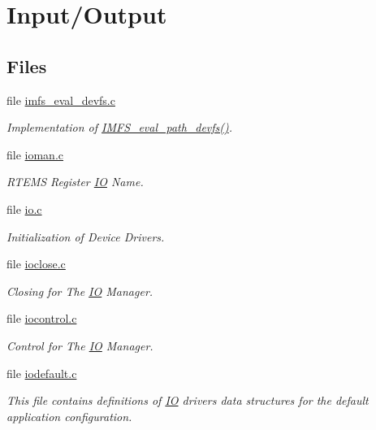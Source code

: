 \hypertarget{group__ClassicIO}{}\section{Input/\+Output}
\label{group__ClassicIO}
\subsection*{Files}
\begin{DoxyCompactItemize}
\item 
file \mbox{\hyperlink{imfs__eval__devfs_8c}{imfs\+\_\+eval\+\_\+devfs.\+c}}
\begin{DoxyCompactList}\small\item\em Implementation of \mbox{\hyperlink{group__IMFS_gafb8a8a9bc61bdf27523823e624dbdd35}{I\+M\+F\+S\+\_\+eval\+\_\+path\+\_\+devfs()}}. \end{DoxyCompactList}\item 
file \mbox{\hyperlink{ioman_8c}{ioman.\+c}}
\begin{DoxyCompactList}\small\item\em R\+T\+E\+MS Register \mbox{\hyperlink{structIO}{IO}} Name. \end{DoxyCompactList}\item 
file \mbox{\hyperlink{cpukit_2sapi_2src_2io_8c}{io.\+c}}
\begin{DoxyCompactList}\small\item\em Initialization of Device Drivers. \end{DoxyCompactList}\item 
file \mbox{\hyperlink{ioclose_8c}{ioclose.\+c}}
\begin{DoxyCompactList}\small\item\em Closing for The \mbox{\hyperlink{structIO}{IO}} Manager. \end{DoxyCompactList}\item 
file \mbox{\hyperlink{iocontrol_8c}{iocontrol.\+c}}
\begin{DoxyCompactList}\small\item\em Control for The \mbox{\hyperlink{structIO}{IO}} Manager. \end{DoxyCompactList}\item 
file \mbox{\hyperlink{iodefault_8c}{iodefault.\+c}}
\begin{DoxyCompactList}\small\item\em This file contains definitions of \mbox{\hyperlink{structIO}{IO}} drivers data structures for the default application configuration. \end{DoxyCompactList}\item 

\end{DoxyCompactItemize}
